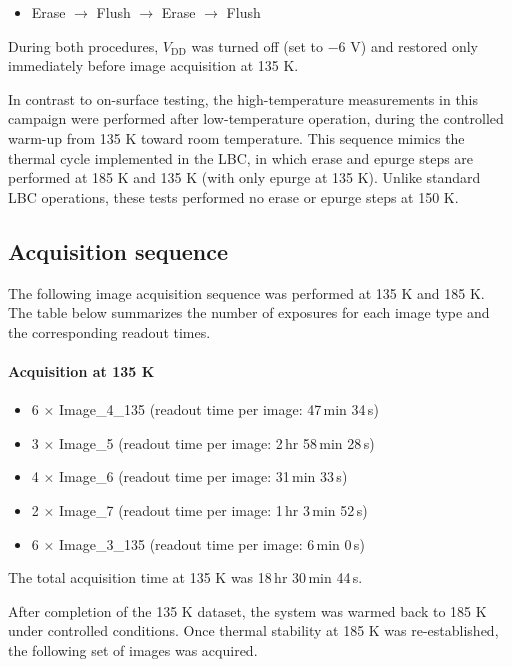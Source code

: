 \documentclass[11pt]{article}
\begin{document}
\begin{itemize}
    \item Erase $\rightarrow$ Flush $\rightarrow$ Erase $\rightarrow$ Flush
\end{itemize}

During both procedures, $V_{\mathrm{DD}}$ was turned off (set to $-6$ V) and restored only immediately before image acquisition at 135 K.

In contrast to on-surface testing, the high-temperature measurements in this campaign were performed after low-temperature operation, during the controlled warm-up from 135 K toward room temperature. This sequence mimics the thermal cycle implemented in the LBC, in which erase and epurge steps are performed at 185 K and 135 K (with only epurge at 135 K). Unlike standard LBC operations, these tests performed no erase or epurge steps at 150 K.


\subsection{Acquisition sequence} 

The following image acquisition sequence was performed at 135 K and 185 K. The table below summarizes the number of exposures for each image type and the corresponding readout times.

\paragraph{Acquisition at 135 K}

\begin{itemize}
    \item 6 $\times$ Image\_4\_135 \hfill (readout time per image: 47\,min 34\,s)
    \item 3 $\times$ Image\_5 \hfill (readout time per image: 2\,hr 58\,min 28\,s)
    \item 4 $\times$ Image\_6 \hfill (readout time per image: 31\,min 33\,s)
    \item 2 $\times$ Image\_7 \hfill (readout time per image: 1\,hr 3\,min 52\,s)
    \item 6 $\times$ Image\_3\_135 \hfill (readout time per image: 6\,min 0\,s)
\end{itemize}

The total acquisition time at 135 K was 18\,hr 30\,min 44\,s.

After completion of the 135 K dataset, the system was warmed back to 185 K under controlled conditions. Once thermal stability at 185 K was re-established, the following set of images was acquired.
\end{document}
